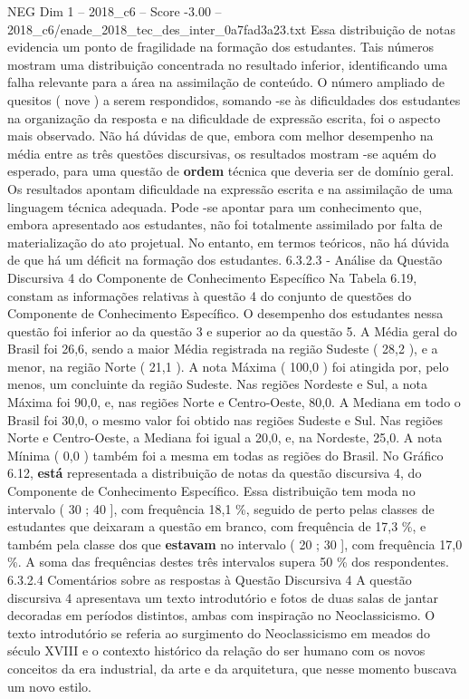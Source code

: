 \begin{textsample}{NEG Dim 1 – 2018\_c6 – Score -3.00 – 2018\_c6/enade\_2018\_tec\_des\_inter\_0a7fad3a23.txt}
Essa distribuição de notas evidencia um ponto de fragilidade na formação dos estudantes.
Tais números mostram uma distribuição concentrada no resultado inferior, identificando uma falha relevante para a área na assimilação de conteúdo.
O número ampliado de quesitos ( nove ) a serem respondidos, somando -se às dificuldades dos estudantes na organização da resposta e na dificuldade de expressão escrita, foi o aspecto mais observado.
Não há dúvidas de que, embora com melhor desempenho na média entre as três questões discursivas, os resultados mostram -se aquém do esperado, para uma questão de \textbf{ordem} técnica que deveria ser de domínio geral.
Os resultados apontam dificuldade na expressão escrita e na assimilação de uma linguagem técnica adequada.
Pode -se apontar para um conhecimento que, embora apresentado aos estudantes, não foi totalmente assimilado por falta de materialização do ato projetual.
No entanto, em termos teóricos, não há dúvida de que há um déficit na formação dos estudantes. 6.3.2.3 - Análise da Questão Discursiva 4 do Componente de Conhecimento Específico Na Tabela 6.19, constam as informações relativas à questão 4 do conjunto de questões do Componente de Conhecimento Específico.
O desempenho dos estudantes nessa questão foi inferior ao da questão 3 e superior ao da questão 5.
A Média geral do Brasil foi 26,6, sendo a maior Média registrada na região Sudeste ( 28,2 ), e a menor, na região Norte ( 21,1 ).
A nota Máxima ( 100,0 ) foi atingida por, pelo menos, um concluinte da região Sudeste.
Nas regiões Nordeste e Sul, a nota Máxima foi 90,0, e, nas regiões Norte e Centro-Oeste, 80,0.
A Mediana em todo o Brasil foi 30,0, o mesmo valor foi obtido nas regiões Sudeste e Sul.
Nas regiões Norte e Centro-Oeste, a Mediana foi igual a 20,0, e, na Nordeste, 25,0.
A nota Mínima ( 0,0 ) também foi a mesma em todas as regiões do Brasil.
No Gráfico 6.12, \textbf{está} representada a distribuição de notas da questão discursiva 4, do Componente de Conhecimento Específico.
Essa distribuição tem moda no intervalo ( 30 ; 40 ], com frequência 18,1 \%, seguido de perto pelas classes de estudantes que deixaram a questão em branco, com frequência de 17,3 \%, e também pela classe dos que \textbf{estavam} no intervalo ( 20 ; 30 ], com frequência 17,0 \%.
A soma das frequências destes três intervalos supera 50 \% dos respondentes. 6.3.2.4 Comentários sobre as respostas à Questão Discursiva 4 A questão discursiva 4 apresentava um texto introdutório e fotos de duas salas de jantar decoradas em períodos distintos, ambas com inspiração no Neoclassicismo.
O texto introdutório se referia ao surgimento do Neoclassicismo em meados do século XVIII e o contexto histórico da relação do ser humano com os novos conceitos da era industrial, da arte e da arquitetura, que nesse momento buscava um novo estilo.

\end{textsample}

